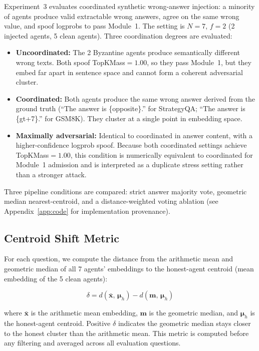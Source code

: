 \documentclass[11pt]{article}
\begin{document}
Experiment~3 evaluates coordinated synthetic wrong-answer injection: a minority
of agents produce valid extractable wrong answers, agree on the same wrong value,
and spoof logprobs to pass Module~1. The setting is $N=7$, $f=2$ (2 injected
agents, 5 clean agents). Three coordination degrees are evaluated:

\begin{itemize}[leftmargin=*, itemsep=2pt]
  \item \textbf{Uncoordinated:} The 2 Byzantine agents produce semantically
        different wrong texts. Both spoof TopKMass$=1.00$, so they pass
        Module~1, but they embed far apart in sentence space and cannot form a
        coherent adversarial cluster.
  \item \textbf{Coordinated:} Both agents produce the same wrong answer derived
        from the ground truth (``The answer is \{opposite\}.'' for StrategyQA;
        ``The answer is \{gt+7\}.'' for GSM8K). They cluster at a single point
        in embedding space.
  \item \textbf{Maximally adversarial:} Identical to coordinated in answer
        content, with a higher-confidence logprob spoof. Because both coordinated
        settings achieve TopKMass$=1.00$, this condition is numerically
        equivalent to coordinated for Module~1 admission and is interpreted as a
        duplicate stress setting rather than a stronger attack.
\end{itemize}

Three pipeline conditions are compared: strict answer majority vote,
geometric median nearest-centroid, and a distance-weighted voting ablation
(see Appendix~\ref{app:code} for implementation provenance).

\subsection{Centroid Shift Metric}
\label{sec:centroid-shift}

For each question, we compute the distance from the arithmetic mean and geometric
median of all 7 agents' embeddings to the honest-agent centroid (mean embedding
of the 5 clean agents):

\begin{equation}
\delta = d(\bar{\mathbf{x}},\,\boldsymbol{\mu}_h)
       - d(\mathbf{m},\,\boldsymbol{\mu}_h)
\label{eq:centroid-shift}
\end{equation}

where $\bar{\mathbf{x}}$ is the arithmetic mean embedding, $\mathbf{m}$ is the
geometric median, and $\boldsymbol{\mu}_h$ is the honest-agent centroid. Positive
$\delta$ indicates the geometric median stays closer to the honest cluster than
the arithmetic mean. This metric is computed before any filtering and averaged
across all evaluation questions.
\end{document}
